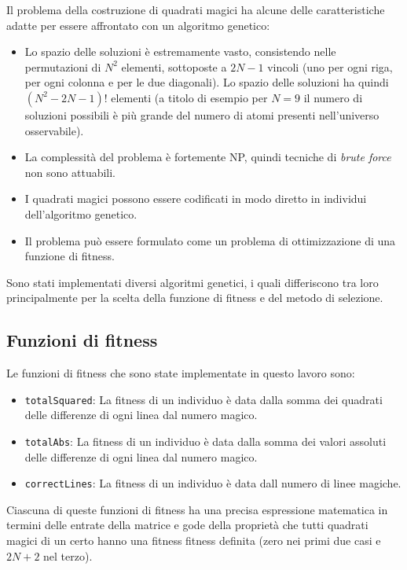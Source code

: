 \documentclass[italian,twoside,twocolumn]{article}
\begin{document}
\noindent
Il problema della costruzione di quadrati magici ha alcune delle caratteristiche adatte per essere affrontato con un algoritmo genetico:
\begin{itemize}
	\item Lo spazio delle soluzioni è estremamente vasto, consistendo nelle permutazioni di $ N^2 $ elementi, sottoposte a $ 2 N - 1 $ vincoli (uno per ogni riga, per ogni colonna e per le due diagonali). Lo spazio delle soluzioni ha quindi $ (N^2 - 2N - 1)! $ elementi (a titolo di esempio per $ N = 9 $ il numero di soluzioni possibili è più grande del numero di atomi presenti nell'universo osservabile). 
	\item La complessità del problema è fortemente NP, quindi tecniche di \emph{brute force} non sono attuabili.
	\item I quadrati magici possono essere codificati in modo diretto in individui dell'algoritmo genetico.
	\item Il problema può essere formulato come un problema di ottimizzazione di una funzione di fitness.
\end{itemize}
Sono stati implementati diversi algoritmi genetici, i quali differiscono tra loro principalmente per la scelta della funzione di fitness e del metodo di selezione. 

\subsection{Funzioni di fitness}
Le funzioni di fitness che sono state implementate in questo lavoro sono: 
\begin{itemize}
	\item \texttt{totalSquared}: La fitness di un individuo è data dalla somma dei quadrati delle differenze di ogni linea dal numero magico.
	\item \texttt{totalAbs}: La fitness di un individuo è data dalla somma dei valori assoluti delle differenze di ogni linea dal numero magico.
	\item \texttt{correctLines}: La fitness di un individuo è data dall numero di linee magiche. 
\end{itemize}
Ciascuna di queste funzioni di fitness ha una precisa espressione matematica in termini delle entrate della matrice e gode della proprietà che tutti quadrati magici di un certo hanno una fitness fitness definita (zero nei primi due casi e $ 2N + 2 $ nel terzo). 
\end{document}
